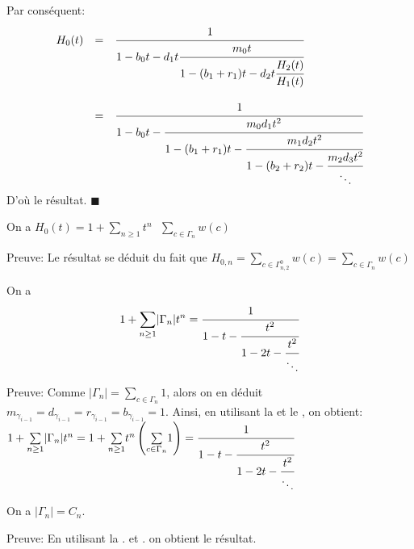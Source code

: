 Par conséquent:
\[
	\begin{array}{r c l}
		H_{0}(t) & =       & \cfrac{1}{1-b_{0}t-d_{1}t\cfrac{m_{0}t}{1-(b_{1}+r_{1})t-d_{2}t\cfrac{H_{2}(t)}{H_{1}(t)}}}                   \\
		         & \text{} &                                                                                                               \\
		         & =       & \cfrac{1}{1-b_{0}t-\cfrac{m_{0}d_{1}t^2}{1-(b_{1}+r_{1})t-\cfrac{m_{1}d_{2}t^2}{1-(b_{2}+r_{2})t-\cfrac{m_{2}
			d_{3}t^2}{\ddots}}}}
	\end{array}
\]
D'où le résultat. \hspace{5pt}$\blacksquare$

\begin{corollaire} \label{H0(t)}
	On a $H_{0}(t) = 1 + \underset{n\geq 1}{\sum}t^{n}\text{ }\underset{c\in \Gamma_{n}}{\sum} w(c)$
\end{corollaire}
Preuve: Le résultat se déduit du fait que  $H_{0,n} = \underset{c\in \Gamma_{n,2}^{0}}{\sum}w(c) = \underset{c\in \Gamma_{n}}{\sum}w(c)$

\begin{proposition}\label{gamma-frac}
	On a \[1+\underset{n \geq 1}{\sum}|\Gamma_{n}|t^n = \cfrac{1}{1-t-\cfrac{t^2}{1-2t-\cfrac{t^2}{\ddots}}}\]
\end{proposition}
Preuve:
Comme $|\Gamma_{n}| = \underset{c\in \Gamma_{n}}{\sum}1 $, alors on en déduit
$m_{\gamma_{i-1}}=d_{\gamma_{i-1}}=r_{\gamma_{i-1}}=b_{\gamma_{i-1}}=1$. Ainsi, en
utilisant la  et le , on obtient:\\
$
	1+\underset{n \geq 1}{\sum}|\Gamma_{n}|t^n = 1 + \underset{n \geq 1}{\sum}t^n \left(
	\underset{c\in \Gamma_{n}}{\sum}1  \right) = \cfrac{1}{1-t-\cfrac{t^2}{1-2t-
			\cfrac{t^2}{\ddots}}}
$

\begin{corollaire}
	On a $|\Gamma_{n}|=C_{n}$.
\end{corollaire}
Preuve: En utilisant la . et . on
obtient le résultat.\\

